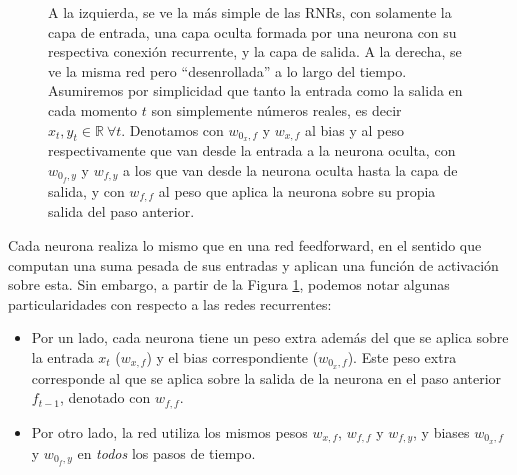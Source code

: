 \documentclass[../../main.tex]{subfiles}
\begin{document}
\begin{figure}[ht]
    \caption{A la izquierda, se ve la más simple de las RNRs, con solamente la capa de
    entrada, una capa oculta formada por una neurona con su respectiva conexión
    recurrente, y la capa de salida. A la derecha, se ve la misma red pero
    ``desenrollada'' a lo largo del tiempo. Asumiremos por simplicidad que tanto la
    entrada como la salida en cada momento \(t\) son simplemente números reales, es decir
    \(x_t, y_t \in \mathbb{R} \ \forall t\). Denotamos con \(w_{0_x,f}\) y \(w_{x,f}\) al
    bias y al peso respectivamente que van desde la entrada a la neurona oculta, con
    \(w_{0_f,y}\) y \(w_{f,y}\) a los que van desde la neurona oculta hasta la capa de
    salida, y con \(w_{f,f}\) al peso que aplica la neurona sobre su propia salida del
    paso anterior.}
    \label{fig:simple-rnn}
\end{figure}

Cada neurona realiza lo mismo que en una red feedforward, en el sentido que computan una
suma pesada de sus entradas y aplican una función de activación sobre esta. Sin embargo, a
partir de la Figura \ref{fig:simple-rnn}, podemos notar algunas particularidades con
respecto a las redes recurrentes:
\begin{itemize}
    \item Por un lado, cada neurona tiene un peso extra además del que se aplica sobre la
    entrada \(x_t\) (\(w_{x,f}\)) y el bias correspondiente (\(w_{0_x,f}\)). Este peso
    extra corresponde al que se aplica sobre la salida de la neurona en el paso anterior
    \(f_{t-1}\), denotado con \(w_{f,f}\).
    \item Por otro lado, la red utiliza los mismos pesos \(w_{x,f}\), \(w_{f,f}\) y
    \(w_{f,y}\), y biases \(w_{0_x,f}\) y \(w_{0_f, y}\) en \textit{todos} los pasos de
    tiempo.
\end{itemize}
\end{document}
